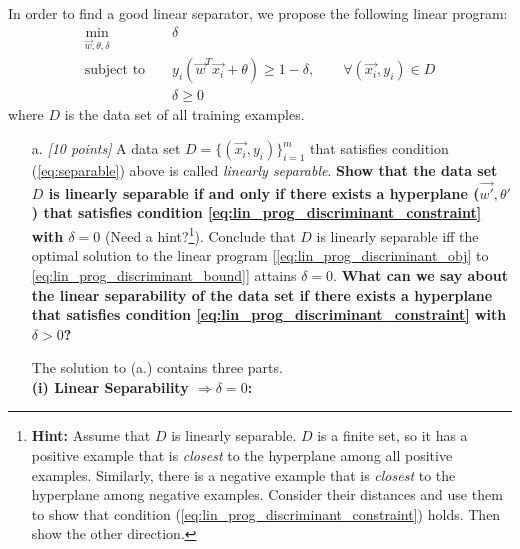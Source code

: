 In order to find a good linear separator, we propose the following linear program:
\begin{eqnarray}
  \min_{\vec{w}, \theta, \delta} & & \delta  \label{eq:lin_prog_discriminant_obj}\\
 \textrm{subject to } & & y_i(\vec{w}^T \vec{x_i} + \theta) \geq 1 - \delta, \qquad \forall (\vec{x_i},y_i) \in D  \label{eq:lin_prog_discriminant_constraint}\\
  & & \delta \geq 0  \label{eq:lin_prog_discriminant_bound}
\end{eqnarray}
where $D$ is the data set of all training examples.
\begin{enumerate}

  
  \item [a.] {\em[10 points]} A data set
      $D=\{(\vec{x_i},y_i)\}_{i=1}^m$ that satisfies 
      condition (\ref{eq:separable}) above is called
      {\em linearly separable}. 
      {\bf Show that the data set
      $D$ is linearly separable 
      if and only if there exists
      a hyperplane ($\vec{w'}, \theta'$) that satisfies 
      condition
      \eqref{eq:lin_prog_discriminant_constraint} with $\delta = 0$} 
	  (Need a hint?\footnote{{\bf Hint:} Assume that $D$ is linearly separable. $D$ is a
      finite set, so it has a positive example that is {\em closest}
      to the hyperplane among all positive examples. Similarly, there
      is a negative example that is {\em closest} to the hyperplane
      among negative examples. Consider their distances and use them
      to show that condition
      (\ref{eq:lin_prog_discriminant_constraint}) holds. Then show the
      other direction.
	  }).
      Conclude that $D$ is linearly separable iff the optimal solution
      to the linear program
      [\eqref{eq:lin_prog_discriminant_obj} to \eqref{eq:lin_prog_discriminant_bound}]
      attains $\delta = 0$.
      {\bf What can we say about the linear separability of the data set
      if there exists a hyperplane that satisfies condition
      \eqref{eq:lin_prog_discriminant_constraint} with $\delta > 0$?}


{
\color{red}
  The solution to (a.) contains three parts. \\
     
      \noindent \textbf{(i) Linear Separability $\Rightarrow \delta = 0$:}


}
\end{enumerate}
